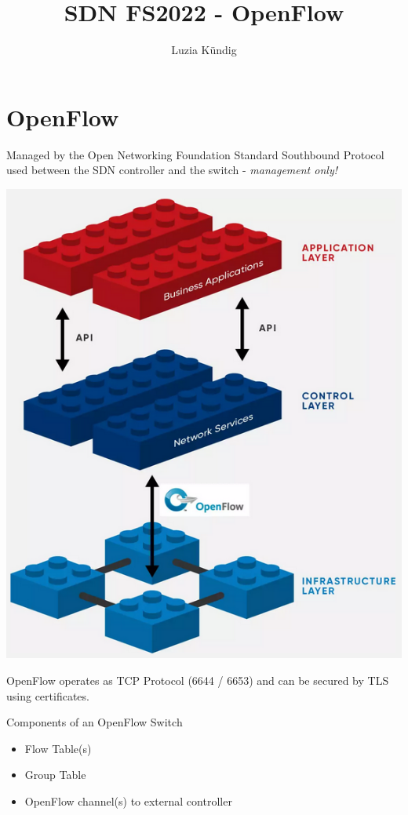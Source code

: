 \documentclass[11pt, a4paper]{article}
\title{SDN FS2022 - OpenFlow}
\author{Luzia Kündig}
\begin{document}
\maketitle
\section{OpenFlow}
Managed by the Open Networking Foundation
Standard Southbound Protocol used between the SDN controller and the switch - \emph{management only!}

\begin{centering}
\includegraphics[scale=0.3]{openflow-basic}
\end{centering}

OpenFlow operates as TCP Protocol (6644 / 6653) and can be secured by TLS using certificates.

\noindent
Components of an OpenFlow Switch
\begin{itemize}
	\item Flow Table(s)
	\item Group Table
	\item OpenFlow channel(s) to external controller
\end{itemize}
\end{document}
